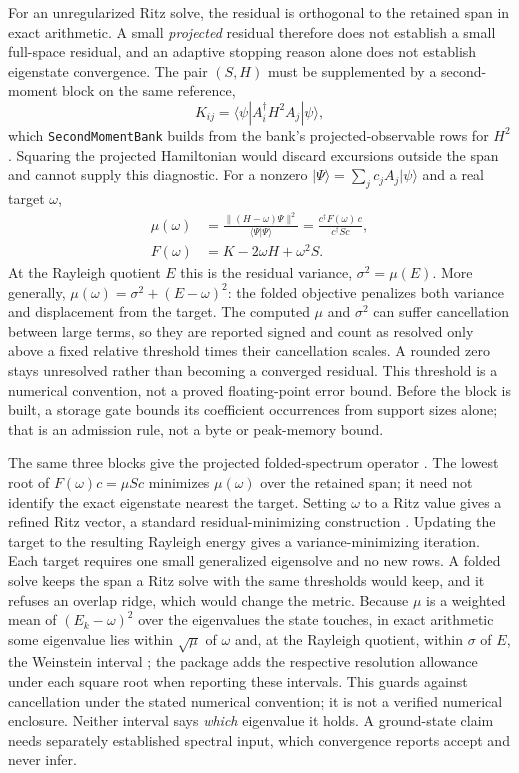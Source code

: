 \documentclass[aps,pra,reprint,superscriptaddress,nofootinbib,floatfix,
  showkeys]{revtex4-2}
\newcommand{\ket}[1]{\lvert #1\rangle}
\newcommand{\avg}[1]{\langle #1\rangle}
\begin{document}
For an unregularized Ritz solve, the residual is orthogonal to the retained
span in exact arithmetic. A small \emph{projected} residual therefore does not
establish a small full-space residual, and an adaptive stopping reason alone
does not establish eigenstate convergence. The pair $(S,H)$ must be supplemented
by a second-moment block on the same reference,
\begin{equation}
 K_{ij}=\avg{\psi|A_i^\dagger H^2 A_j|\psi},
 \label{eq:second-moment}
\end{equation}
which \texttt{SecondMomentBank} builds from the bank's projected-observable rows
for $H^2$. Squaring the projected Hamiltonian would discard excursions outside
the span and cannot supply this diagnostic. For a nonzero
$\ket{\Psi}=\sum_j c_j A_j\ket{\psi}$ and a real target
$\omega$,
\begin{align}
 \mu(\omega)&=\frac{\lVert(H-\omega)\Psi\rVert^2}{\avg{\Psi|\Psi}}
 =\frac{c^\dagger F(\omega)\,c}{c^\dagger S c}, \nonumber\\
 F(\omega)&=K-2\omega H+\omega^2 S.
 \label{eq:folded}
\end{align}
At the Rayleigh quotient $E$ this is the residual variance, $\sigma^2=\mu(E)$.
More generally, $\mu(\omega)=\sigma^2+(E-\omega)^2$: the folded objective
penalizes both variance and displacement from the target.
The computed $\mu$ and $\sigma^2$ can suffer cancellation between large terms,
so they are reported signed and count as resolved only above a fixed relative
threshold times their cancellation scales. A rounded zero stays unresolved
rather than becoming a converged residual. This threshold is a numerical
convention, not a proved floating-point error bound. Before the block is built,
a storage gate bounds its coefficient occurrences from support sizes alone;
that is an admission rule, not a byte or peak-memory bound.

The same three blocks give the projected folded-spectrum operator
\cite{wang1994folded,cadi2024folded}. The lowest root of $F(\omega)c=\mu Sc$
minimizes $\mu(\omega)$ over the retained span; it need not identify the exact
eigenstate nearest the target. Setting $\omega$ to a Ritz value gives a refined
Ritz vector, a standard residual-minimizing construction \cite{jia1997refined}.
Updating the target to the resulting Rayleigh energy gives a variance-minimizing
iteration. Each target requires one small generalized eigensolve and no new rows.
A folded solve keeps the span a Ritz solve with the same thresholds would keep,
and it refuses an overlap ridge, which would change the metric. Because $\mu$ is
a weighted mean of $(E_k-\omega)^2$ over the eigenvalues the state touches, in
exact arithmetic some
eigenvalue lies within $\sqrt{\mu}$ of $\omega$ and, at the Rayleigh quotient,
within $\sigma$ of $E$, the Weinstein interval \cite{weinstein1934modified}; the
package adds the respective resolution allowance under each square root when
reporting these intervals. This guards against cancellation under the stated
numerical convention; it is not a verified numerical enclosure. Neither interval says
\emph{which} eigenvalue it holds. A ground-state claim needs separately
established spectral input, which convergence reports accept and never infer.
\end{document}
